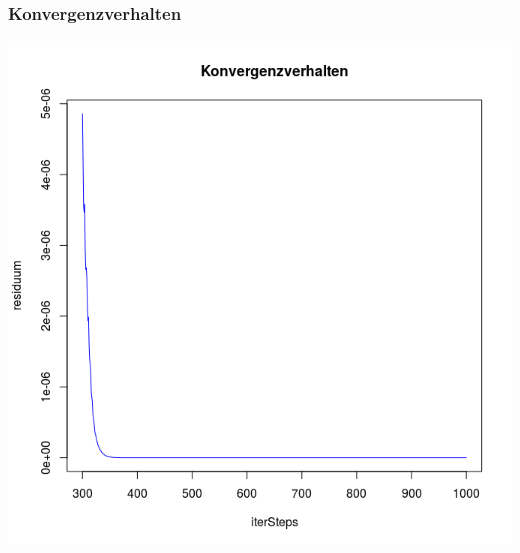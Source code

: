 \documentclass[]{beamer}
\begin{document}
\begin{frame}
\frametitle{Konvergenzverhalten}
\begin{center}
\includegraphics[scale=0.33]{Konvergenzverhalten_300_1000.png}
\end{center}
\end{frame}
\end{document}
